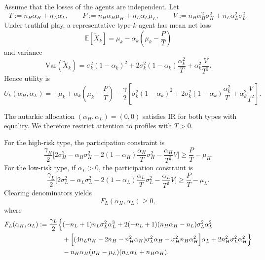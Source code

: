 \documentclass[a4paper,12pt]{article}
\theoremstyle{definition}
\theoremstyle{remark}
\newcommand{\Var}{\mathrm{Var}}
\newcommand{\1}{\mathbf{1}}
\begin{document}
Assume that the losses of the agents are independent. Let
\[
T := n_H \alpha_H + n_L \alpha_L,
\qquad
P := n_H \alpha_H \mu_H + n_L \alpha_L \mu_L,
\qquad
V := n_H \alpha_H^2 \sigma_H^2 + n_L \alpha_L^2 \sigma_L^2 .
\]
Under truthful play, a representative type-\(k\) agent has mean net loss
\[
\mathbb E[\tilde X_k]
=
\mu_k-\alpha_k\!\left(\mu_k-\frac{P}{T}\right)
\]
and variance
\[
\Var(\tilde X_k)
=
\sigma_k^2(1-\alpha_k)^2 + 2\sigma_k^2(1-\alpha_k)\frac{\alpha_k^2}{T} + \alpha_k^2 \frac{V}{T^2}.
\]
Hence utility is
\begin{equation}\label{eq:utility-alpha-ind-new}
U_k(\alpha_H,\alpha_L)
=
-\mu_k
+
\alpha_k\!\left(\mu_k-\frac{P}{T}\right)
-
\frac{\gamma}{2}
\left[
\sigma_k^2(1-\alpha_k)^2 + 2\sigma_k^2(1-\alpha_k)\frac{\alpha_k^2}{T} + \alpha_k^2 \frac{V}{T^2}
\right].
\end{equation}



The autarkic allocation \((\alpha_H,\alpha_L)=(0,0)\) satisfies IR for both types with equality. We therefore restrict attention to profiles with \(T>0\).

For the high-risk type, the participation constraint is
\begin{equation}\label{eq:IRH-ind-new}
    \frac{\gamma_H}{2}\Big[
        2\sigma_H^2 - \alpha_H \sigma_H^2
        - 2(1-\alpha_H)\frac{\alpha_H}{T}\sigma_H^2
        - \frac{\alpha_H}{T^2} V
    \Big] \ge \frac{P}{T} - \mu_H.
\end{equation}
For the low-risk type, if \(\alpha_L>0\), the participation constraint is
\begin{equation}\label{eq:IRL-ind-new}
    \frac{\gamma_L}{2}\Big[
        2\sigma_L^2 - \alpha_L \sigma_L^2
        - 2(1-\alpha_L)\frac{\alpha_L}{T}\sigma_L^2
        - \frac{\alpha_L}{T^2} V
    \Big] \ge \frac{P}{T} - \mu_L.
\end{equation}
Clearing denominators yields
\begin{equation}\label{eq:IRLcore-new}
F_L(\alpha_H,\alpha_L)\ge 0,
\end{equation}
where
\begin{align}
F_L(\alpha_H,\alpha_L)
:=
\frac{\gamma_L}{2}\Big\{&
    (-n_L+1)n_L \sigma_L^2 \alpha_L^3
    + 2(-n_L+1)(n_H \alpha_H - n_L)\sigma_L^2 \alpha_L^2 \notag\\
    &+ \Big[(4n_L n_H - 2n_H - n_H^2 \alpha_H)\sigma_L^2 \alpha_H - \sigma_H^2 n_H \alpha_H^2\Big]\alpha_L
    + 2n_H^2 \sigma_L^2 \alpha_H^2 \Big\}
\notag\\
&
- n_H \alpha_H (\mu_H - \mu_L)(n_L \alpha_L + n_H \alpha_H).
\label{eq:FL-expanded-new}
\end{align}
\end{document}
